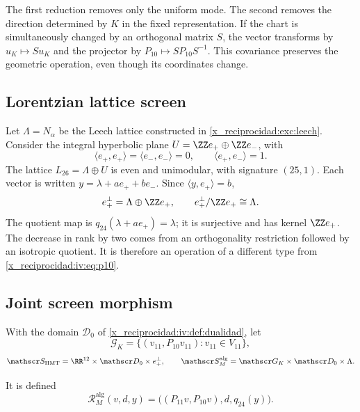 The first reduction removes only the uniform mode.
The second removes the direction determined by \(K\) in
the fixed representation. If the chart is simultaneously changed
by an orthogonal matrix \(S\), the vector transforms by
\(u_K\mapsto Su_K\) and the projector by
\(P_{10}\mapsto SP_{10}S^{-1}\). This covariance preserves
the geometric operation, even though its coordinates change.

\subsection{Lorentzian lattice screen}

Let \(\Lambda=N_\alpha\) be the Leech lattice constructed
in \ref{x_reciprocidad:exc:leech}. Consider the integral hyperbolic plane
\(U=\ZZ e_+\oplus\ZZ e_-\), with
\[
 \langle e_+,e_+\rangle=\langle e_-,e_-\rangle=0,
 \qquad\langle e_+,e_-\rangle=1.
\]
The lattice \(L_{26}=\Lambda\oplus U\) is even and
unimodular, with signature \((25,1)\). Each vector is written
\(y=\lambda+ae_++be_-\). Since
\(\langle y,e_+\rangle=b\),
\begin{equation}
 e_+^\perp=\Lambda\oplus\ZZ e_+,
 \qquad e_+^\perp/\ZZ e_+\cong\Lambda.
 \label{x_reciprocidad:iv:eq:26-24}
\end{equation}
The quotient map is
\(q_{24}(\lambda+ae_+)=\lambda\); it is surjective and has
kernel \(\ZZ e_+\). The decrease in rank by two comes
from an orthogonality restriction followed by an isotropic
quotient. It is therefore an operation of a different type from
\eqref{x_reciprocidad:iv:eq:p10}.

\subsection{Joint screen morphism}

With the domain \(\mathscr D_0\) of \ref{x_reciprocidad:iv:def:dualidad},
let
\[
 \mathscr G_K=\{(v_{11},P_{10}v_{11}):v_{11}\in V_{11}\},
\]
\[
 \mathscr S_{\mathrm{HMT}}=\RR^{12}\times\mathscr D_0\times e_+^\perp,
 \qquad
 \mathscr S_M^{\mathrm{alg}}=\mathscr G_K\times\mathscr D_0\times\Lambda.
\]
\begin{definition}
\label{x_reciprocidad:iv:def:rm-alg}
It is defined
\begin{equation}
 \mathcal R_M^{\mathrm{alg}}(v,d,y)
 =\bigl((P_{11}v,P_{10}v),d,q_{24}(y)\bigr).
 \label{x_reciprocidad:iv:eq:rm-alg}
\end{equation}
\end{definition}


